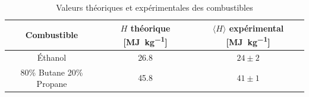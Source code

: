 \begin{table}[h]
    \centering
    \begin{tabulary}{\linewidth}{C C C}
        \toprule
        Combustible & \(H\) théorique [\si{\mega\joule\per\kilo\gram}] & \(\langle H \rangle\) expérimental [\si{\mega\joule\per\kilo\gram}] \\
        \midrule
        Éthanol & 26.8 & \(24 \pm 2\) \\
        80\% Butane 20\% Propane & 45.8 & \(41 \pm 1\) \\
        \bottomrule
    \end{tabulary}
    \caption{Valeurs théoriques et expérimentales des combustibles}
    \label{tab:pouvoir_calorifique}
\end{table}
